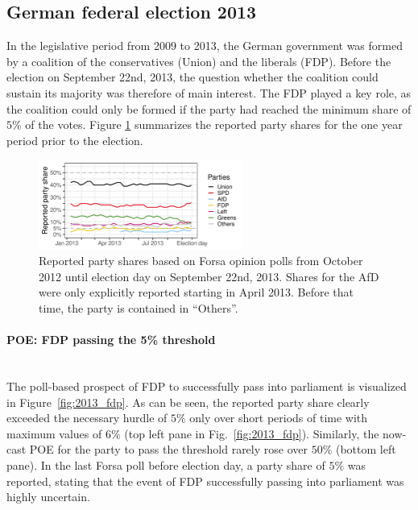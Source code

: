 \documentclass[smallcondensed]{svjour3}     %
\begin{document}
\subsection{German federal election 2013} \label{subsec:2013}
In the legislative period from 2009 to 2013, the German government was formed by
a coalition of the conservatives (Union) and the liberals (FDP). Before the
election on September 22nd, 2013, the question whether the coalition could
sustain its majority was therefore of main interest. The FDP played a key role,
as the coalition could only be formed if the party had reached the minimum share
of $5\%$ of the votes. Figure \ref{fig:2013} summarizes the reported party shares
for the one year period prior to the election.

\begin{figure}[H]\centering
\includegraphics[width=0.6\textwidth]{figures/2013_forsa_rawShares.pdf}
\caption{Reported party shares based on Forsa opinion polls 
from October 2012 until election day on September 22nd, 2013.
Shares for the AfD were only explicitly reported starting in April 2013.
Before that time, the party is contained in ``Others''.
\label{fig:2013}
}
\end{figure}


\paragraph{POE: FDP passing the 5\% threshold} \ \\

The poll-based prospect of FDP to successfully pass into parliament is visualized
in Figure~\ref{fig:2013_fdp}.
As can be seen, the reported party share clearly exceeded the necessary hurdle
of $5\%$ only over short periods of time with maximum values
of $6\%$ (top left pane in Fig.~\ref{fig:2013_fdp}). Similarly, the now-cast POE
for the party to pass the threshold rarely rose over $50\%$ (bottom left pane).
In the last Forsa poll before election day, a party share of $5\%$ was reported,
stating that the event of FDP successfully passing into parliament was highly uncertain.\\
\end{document}
